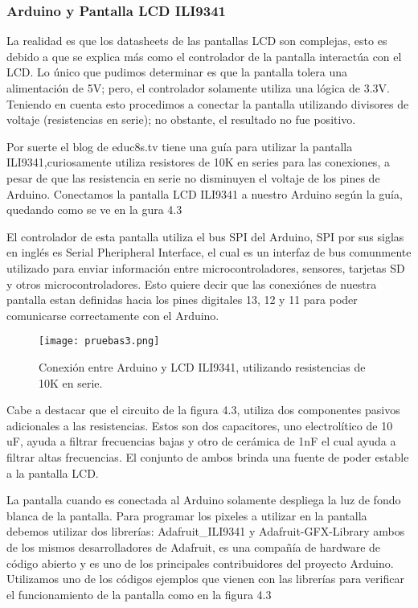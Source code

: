 \subsubsection{Arduino y Pantalla LCD ILI9341}
\par 
La realidad es que los datasheets de las pantallas LCD son complejas, esto es debido a que se explica más como el controlador de la pantalla interactúa con el LCD. Lo único que pudimos determinar es que la pantalla tolera una alimentación de 5V; pero, el controlador solamente utiliza una lógica de 3.3V. Teniendo en cuenta esto procedimos a conectar la pantalla utilizando divisores de voltaje (resistencias en serie); no obstante, el resultado no fue positivo.

\par \noindent
Por suerte el blog de educ8s.tv\cite{edu8tv} tiene una guía para utilizar la pantalla ILI9341,curiosamente utiliza resistores de 10K en series para las conexiones, a pesar de que las resistencia en serie no disminuyen el voltaje de los pines de Arduino. Conectamos la pantalla LCD ILI9341 a nuestro Arduino según la guía, quedando como se ve en la  gura 4.3

\par \noindent
El controlador de esta pantalla utiliza el bus SPI del Arduino, SPI por sus siglas en inglés es Serial Pheripheral Interface, el cual es un interfaz de bus comunmente utilizado para enviar información entre microcontroladores, sensores, tarjetas SD y otros microcontroladores. Esto quiere decir que las conexiónes de nuestra pantalla estan definidas hacia los pines digitales 13, 12 y 11 para poder comunicarse correctamente con el Arduino.

\begin{figure}[H]
	\centering
	\texttt{[image: pruebas3.png]}
	\caption{Conexión entre Arduino y LCD ILI9341, utilizando resistencias de 10K en serie.}
\end{figure}

\clearpage

\par \noindent
Cabe a destacar que el circuito de la figura 4.3, utiliza dos componentes pasivos adicionales a las resistencias. Estos son dos capacitores, uno electrolítico de 10 uF, ayuda a filtrar frecuencias bajas y otro de cerámica de 1nF el cual ayuda a filtrar altas frecuencias. El conjunto de ambos brinda una fuente de poder estable a la pantalla LCD.

\par \noindent
La pantalla cuando es conectada al Arduino solamente despliega la luz de fondo blanca de la pantalla. Para programar los pixeles a utilizar en la pantalla debemos utilizar dos librerías: Adafruit\_ILI9341\cite{adafruit-lcd} y Adafruit-GFX-Library\cite{adafruit-gfx} ambos de los mismos desarrolladores de Adafruit, es una compañía de hardware de código abierto y es uno de los principales contribuidores del proyecto Arduino. Utilizamos uno de los códigos ejemplos que vienen con las librerías para verificar el funcionamiento de la pantalla como en la figura 4.3

